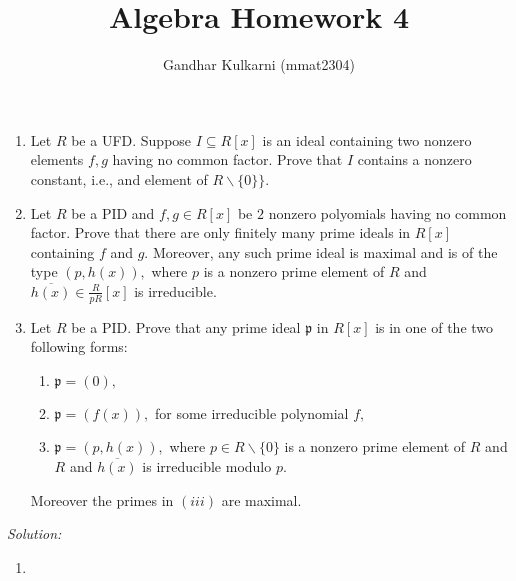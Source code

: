 \documentclass[]{article}
\title{Algebra Homework 4}
\author{Gandhar Kulkarni (mmat2304)}
\begin{document}
\maketitle

\section{}

\section{}
\section{}
\begin{enumerate}
	\item Let $R$ be a UFD. Suppose $I \subseteq R[x]$ is an ideal containing two nonzero elements $f,g$ having no common factor. Prove that $I$ contains a nonzero constant, i.e., and element of $R\backslash \{0\}\}.$
	\item Let $R$ be a PID and $f,g \in R[x]$ be $2$ nonzero polyomials having no common factor. Prove that there are only finitely many prime ideals in $R[x]$ containing $f$ and $g$. Moreover, any such prime ideal is maximal and is of the type $(p,h(x)),$ where $p$ is a nonzero prime element of $R$ and $\overline{h(x)} \in \frac{R}{pR}[x]$ is irreducible.
	
	\item Let $R$ be a PID. Prove that any prime ideal $\mathfrak{p}$  in $R[x]$ is in one of the two following forms: 
	\begin{enumerate}
		\item $\mathfrak{p}=(0),$
		\item $\mathfrak{p}=(f(x)),$ for some irreducible polynomial $f,$
		\item $\mathfrak{p}=(p,h(x)),$ where $p \in R\backslash \{0\}$ is a nonzero prime element of $R$ and $R$ and $\overline{h(x)}$ is irreducible modulo $p.$
	\end{enumerate}
	Moreover the primes in $(iii)$ are maximal.
\end{enumerate}

\emph{Solution:} \begin{enumerate}
	\item 
\end{enumerate} 
\end{document}
